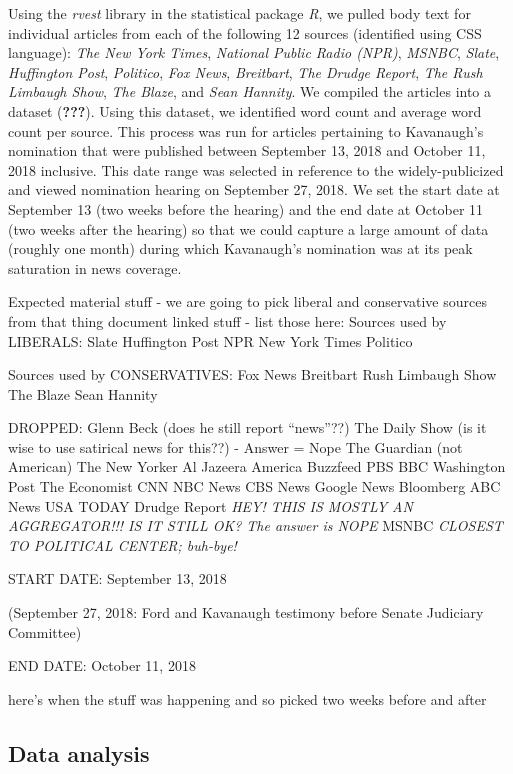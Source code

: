 \documentclass[,man]{apa6}
\begin{document}
Using the \emph{rvest} library in the statistical package \emph{R}, we pulled body text for individual articles from each of the following 12 sources (identified using CSS language): \emph{The New York Times}, \emph{National Public Radio (NPR)}, \emph{MSNBC}, \emph{Slate}, \emph{Huffington Post}, \emph{Politico}, \emph{Fox News}, \emph{Breitbart}, \emph{The Drudge Report}, \emph{The Rush Limbaugh Show}, \emph{The Blaze}, and \emph{Sean Hannity}. We compiled the articles into a dataset ({\textbf{???}}). Using this dataset, we identified word count and average word count per source. This process was run for articles pertaining to Kavanaugh's nomination that were published between September 13, 2018 and October 11, 2018 inclusive. This date range was selected in reference to the widely-publicized and viewed nomination hearing on September 27, 2018. We set the start date at September 13 (two weeks before the hearing) and the end date at October 11 (two weeks after the hearing) so that we could capture a large amount of data (roughly one month) during which Kavanaugh's nomination was at its peak saturation in news coverage.

Expected material stuff
- we are going to pick liberal and conservative sources from that thing document linked stuff
- list those here:
Sources used by LIBERALS:
Slate
Huffington Post
NPR
New York Times
Politico

Sources used by CONSERVATIVES:
Fox News
Breitbart
Rush Limbaugh Show
The Blaze
Sean Hannity

DROPPED:
Glenn Beck (does he still report \enquote{news}??)
The Daily Show (is it wise to use satirical news for this??) - Answer = Nope
The Guardian (not American)
The New Yorker
Al Jazeera America
Buzzfeed
PBS
BBC
Washington Post
The Economist
CNN
NBC News
CBS News
Google News
Bloomberg
ABC News
USA TODAY
Drudge Report \emph{HEY! THIS IS MOSTLY AN AGGREGATOR!!! IS IT STILL OK? The answer is NOPE}
MSNBC \emph{CLOSEST TO POLITICAL CENTER; buh-bye!}

START DATE: September 13, 2018

(September 27, 2018: Ford and Kavanaugh testimony before Senate Judiciary Committee)

END DATE: October 11, 2018

here's when the stuff was happening and so picked two weeks before and after

\hypertarget{data-analysis-1}{%
\subsection{Data analysis}\label{data-analysis-1}}
\end{document}
